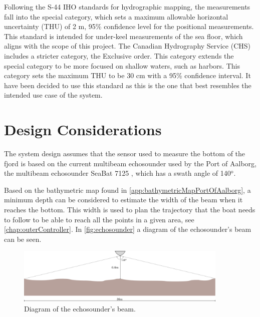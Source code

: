 Following the S-44 IHO standards for hydrographic mapping, the measurements fall into the special category, which sets a maximum allowable horizontal uncertainty (THU) of 2 m, 95\% confidence level for the positional measurements. 
This standard is intended for under-keel measurements of the sea floor, which aligns with the scope of this project.\cite{IHO-S-44} 
The Canadian Hydrography Service (CHS) includes a stricter category, the Exclusive order. 
This category extends the special category to be more focused on shallow waters, such as harbors. 
This category sets the maximum THU to be 30 cm with a 95\% confidence interval. 
It have been decided to use this standard as this is the one that best resembles the intended use case of the system.\cite{CHS}

\section{Design Considerations}\label{sec:designconsiderations}
The system design assumes that the sensor used to measure the bottom of the fjord is based on the current multibeam echosounder used by the Port of Aalborg, the multibeam echosounder SeaBat 7125 \cite{echoSounder}, which has a swath angle of 140$^\mathrm{o}$.

Based on the bathymetric map found in \autoref{app:bathymetricMapPortOfAalborg}, a minimum depth can be considered to estimate the width of the beam when it reaches the bottom. This width is used to plan the trajectory that the boat needs to follow to be able to reach all the points in a given area, see \autoref{chap:outerController}. In \autoref{fig:echosounder} a diagram of the echosounder's beam can be seen.

\begin{figure}[H]
    \includegraphics[width=0.9\textwidth]{figures/echosounder}
    \caption{Diagram of the echosounder's beam.}
    \label{fig:echosounder}
\end{figure}

